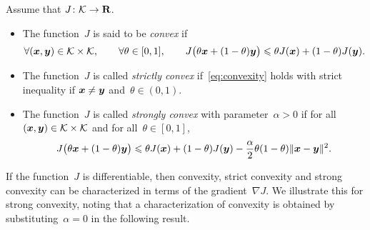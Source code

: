 \begin{definition}
    [Convexity]
    Assume that $J\colon \mathcal K \to \mathbf R$.
    \begin{itemize}
        \item
            The function~$J$ is said to be \emph{convex} if
            \begin{equation}
                \label{eq:convexity}
                \forall (\mathbf{\boldsymbol{x}}, \mathbf{\boldsymbol{y}}) \in \mathcal K \times \mathcal K,
                \qquad \forall \theta \in [0, 1],
                \qquad
                J\bigl(\theta \mathbf{\boldsymbol{x}} + (1 - \theta) \mathbf{\boldsymbol{y}}\bigr)
                \leqslant \theta J(\mathbf{\boldsymbol{x}}) + (1 - \theta) J(\mathbf{\boldsymbol{y}}).
            \end{equation}

        \item
            The function~$J$ is called \emph{strictly convex} if~\eqref{eq:convexity} holds with strict inequality
            if $\mathbf{\boldsymbol{x}} \neq \mathbf{\boldsymbol{y}}$ and~$\theta \in (0, 1)$.

        \item
            The function~$J$ is called \emph{strongly convex} with parameter~$\alpha > 0$ if
            for all $(\mathbf{\boldsymbol{x}}, \mathbf{\boldsymbol{y}}) \in \mathcal K \times \mathcal K$ and for all~$\theta \in [0, 1]$,
            \begin{equation}
                \label{eq:strong_convexity}
                J\bigl(\theta \mathbf{\boldsymbol{x}} + (1 - \theta) \mathbf{\boldsymbol{y}}\bigr)
                \leqslant \theta J(\mathbf{\boldsymbol{x}}) + (1 - \theta) J(\mathbf{\boldsymbol{y}})
                - \frac{\alpha}{2} \theta (1 - \theta) \lVert\mathbf{\boldsymbol{x}} - \mathbf{\boldsymbol{y}}\rVert^2.
            \end{equation}
    \end{itemize}
\end{definition}

If the function~$J$ is differentiable,
then convexity, strict convexity and strong convexity can be characterized in terms of the gradient~$\nabla J$.
We illustrate this for strong convexity,
noting that a characterization of convexity is obtained by substituting~$\alpha = 0$ in the following result.

